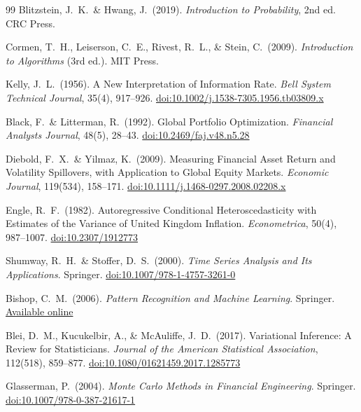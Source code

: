 \documentclass[12pt,openany]{book}
\numberwithin{equation}{chapter}
\theoremstyle{plain}
\theoremstyle{definition}
\theoremstyle{remark}
\begin{document}
\begin{thebibliography}{99}
Blitzstein, J.\ K.\ \& Hwang, J.\ (2019).
\textit{Introduction to Probability}, 2nd ed.
CRC Press.

Cormen, T.\ H., Leiserson, C.\ E., Rivest, R.\ L., \& Stein, C.\ (2009).
\textit{Introduction to Algorithms} (3rd ed.). MIT Press.

Kelly, J.\ L.\ (1956).
A New Interpretation of Information Rate.
\textit{Bell System Technical Journal}, 35(4), 917--926.
\href{https://doi.org/10.1002/j.1538-7305.1956.tb03809.x}{doi:10.1002/j.1538-7305.1956.tb03809.x}

Black, F.\ \& Litterman, R.\ (1992).
Global Portfolio Optimization.
\textit{Financial Analysts Journal}, 48(5), 28--43.
\href{https://doi.org/10.2469/faj.v48.n5.28}{doi:10.2469/faj.v48.n5.28}

Diebold, F.\ X.\ \& Yilmaz, K.\ (2009).
Measuring Financial Asset Return and Volatility Spillovers, with
Application to Global Equity Markets.
\textit{Economic Journal}, 119(534), 158--171.
\href{https://doi.org/10.1111/j.1468-0297.2008.02208.x}{doi:10.1111/j.1468-0297.2008.02208.x}

Engle, R.\ F.\ (1982).
Autoregressive Conditional Heteroscedasticity with Estimates of the
Variance of United Kingdom Inflation.
\textit{Econometrica}, 50(4), 987--1007.
\href{https://doi.org/10.2307/1912773}{doi:10.2307/1912773}

Shumway, R.\ H.\ \& Stoffer, D.\ S.\ (2000).
\textit{Time Series Analysis and Its Applications}.
Springer.
\href{https://doi.org/10.1007/978-1-4757-3261-0}{doi:10.1007/978-1-4757-3261-0}

Bishop, C.\ M.\ (2006).
\textit{Pattern Recognition and Machine Learning}.
Springer.
\href{https://www.microsoft.com/en-us/research/uploads/prod/2006/01/Bishop-Pattern-Recognition-and-Machine-Learning-2006.pdf}{Available online}

Blei, D.\ M., Kucukelbir, A., \& McAuliffe, J.\ D.\ (2017).
Variational Inference: A Review for Statisticians.
\textit{Journal of the American Statistical Association}, 112(518), 859--877.
\href{https://doi.org/10.1080/01621459.2017.1285773}{doi:10.1080/01621459.2017.1285773}

Glasserman, P.\ (2004).
\textit{Monte Carlo Methods in Financial Engineering}.
Springer.
\href{https://doi.org/10.1007/978-0-387-21617-1}{doi:10.1007/978-0-387-21617-1}


\end{thebibliography}
\end{document}

